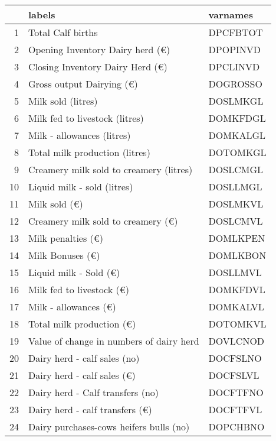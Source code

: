 \documentclass{article}\usepackage{graphicx, color}
\begin{document}
\begin{flushleft}
\newpage
\begin{table}[ht]
\begin{center}
\begin{tabular}{rll}
  \hline
 & labels & varnames \\ 
  \hline
1 & Total  Calf births & DPCFBTOT \\ 
  2 & Opening Inventory  Dairy herd (€) & DPOPINVD \\ 
  3 & Closing Inventory  Dairy Herd (€) & DPCLINVD \\ 
  4 & Gross output Dairying  (€) & DOGROSSO \\ 
  5 & Milk sold             (litres) & DOSLMKGL \\ 
  6 & Milk fed to livestock (litres) & DOMKFDGL \\ 
  7 & Milk - allowances     (litres) & DOMKALGL \\ 
  8 & Total milk production (litres) & DOTOMKGL \\ 
  9 & Creamery milk sold to creamery  (litres) & DOSLCMGL \\ 
  10 & Liquid milk - sold             (litres) & DOSLLMGL \\ 
  11 & Milk sold              (€) & DOSLMKVL \\ 
  12 & Creamery milk sold to creamery (€) & DOSLCMVL \\ 
  13 & Milk penalties                 (€) & DOMLKPEN \\ 
  14 & Milk Bonuses                   (€) & DOMLKBON \\ 
  15 & Liquid milk - Sold             (€) & DOSLLMVL \\ 
  16 & Milk fed to livestock  (€) & DOMKFDVL \\ 
  17 & Milk - allowances      (€) & DOMKALVL \\ 
  18 & Total milk production  (€) & DOTOMKVL \\ 
  19 & Value of change in numbers of dairy herd & DOVLCNOD \\ 
  20 & Dairy herd - calf sales        (no) & DOCFSLNO \\ 
  21 & Dairy herd - calf sales        (€) & DOCFSLVL \\ 
  22 & Dairy herd - Calf transfers    (no) & DOCFTFNO \\ 
  23 & Dairy herd - calf transfers    (€) & DOCFTFVL \\ 
  24 & Dairy purchases-cows heifers bulls (no) & DOPCHBNO \\ 

\end{tabular}
\end{center}
\end{table}
\end{flushleft}
\end{document}
